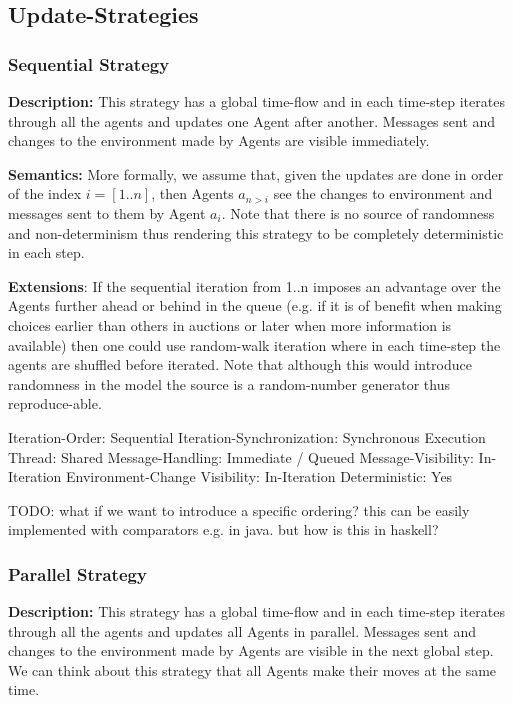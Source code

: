 \subsection{Update-Strategies}

\subsubsection{Sequential Strategy}
\textbf{Description:} This strategy has a global time-flow and in each time-step iterates through all the agents and updates one Agent after another. Messages sent and changes to the environment made by Agents are visible immediately. 

\textbf{Semantics:} More formally, we assume that, given the updates are done in order of the index $i = [1..n]$, then Agents $a_{n>i}$ see the changes to environment and messages sent to them by Agent $a_i$. Note that there is no source of randomness and non-determinism thus rendering this strategy to be completely deterministic in each step. 

\textbf{Extensions}: If the sequential iteration from 1..n imposes an advantage over the Agents further ahead or behind in the queue (e.g. if it is of benefit when making choices earlier than others in auctions or later when more information is available) then one could use random-walk iteration where in each time-step the agents are shuffled before iterated. Note that although this would introduce randomness in the model the source is a random-number generator thus reproduce-able.

	Iteration-Order:			Sequential
	Iteration-Synchronization: 	Synchronous
	Execution Thread:			Shared
 	Message-Handling:			Immediate / Queued
 	Message-Visibility:			In-Iteration
 	Environment-Change Visibility:		In-Iteration
	Deterministic:				Yes
	
TODO: what if we want to introduce a specific ordering? this can be easily implemented with comparators e.g. in java. but how is this in haskell?

\subsubsection{Parallel Strategy}
\textbf{Description:} This strategy has a global time-flow and in each time-step iterates through all the agents and updates all Agents in parallel. Messages sent and changes to the environment made by Agents are visible in the next global step. We can think about this strategy that all Agents make their moves at the same time. 

